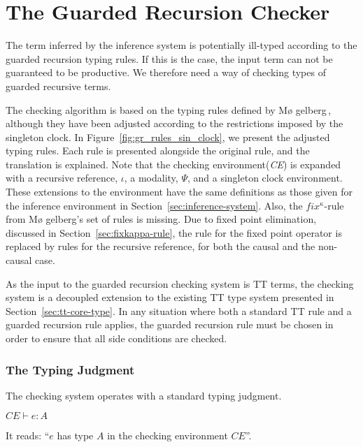 \section{The Guarded Recursion Checker}
\label{sec:guard-recurs-check}
The term inferred by the inference system is potentially ill-typed according to the
guarded recursion typing rules. If this is the case, the input term can not be
guaranteed to be productive. We therefore need a way of checking types of
guarded recursive terms.

The checking algorithm is based on the typing rules defined by M\o
gelberg\,\citep{Mogelberg:2014}, although they have been adjusted according to
the restrictions imposed by the singleton clock. In Figure~\ref{fig:gr_rules_sin_clock}, we
present the adjusted typing rules. Each rule is presented alongside the original
rule, and the translation is explained. Note that the
checking environment(\emph{CE}) is expanded with a recursive reference, $\iota$, a modality, $\Psi$,
and a singleton clock environment. These extensions to the environment 
have the same definitions as those given for the inference environment in
Section~\ref{sec:inference-system}. Also, the $fix^\kappa$-rule from M\o
gelberg's set of rules is missing. Due to fixed point elimination, discussed in
Section~\ref{sec:fixkappa-rule}, the rule for the fixed point operator is
replaced by rules for the recursive reference, for both the causal and the non-causal case.

As the input to the guarded recursion checking system is TT terms, the checking system is a
decoupled extension to the existing TT type system presented in Section~\ref{sec:tt-core-type}. In any situation where
both a standard TT rule and a guarded recursion rule applies, the guarded
recursion rule must be chosen in order to ensure that all side conditions are checked.


\subsubsection{The Typing Judgment}
The checking system operates with a standard typing judgment.
\begin{center}
  ${CE\vdash e : A}$
\end{center}
It reads: ``$e$ has type $A$ in the checking environment $CE$''. 

